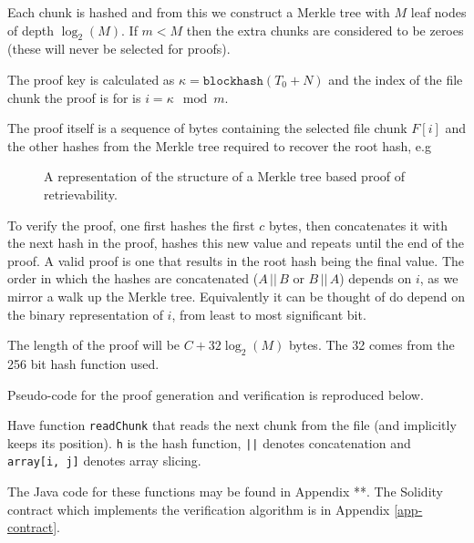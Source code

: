 \documentclass[10pt,twoside,a4paper]{article}
\begin{document}
Each chunk is hashed and from this we construct a Merkle tree with $M$ leaf nodes of depth $\log_2(M)$.
If $m < M$ then the extra chunks are considered to be zeroes (these will never be selected for proofs).



The proof key is calculated as $\kappa = \texttt{blockhash}(T_0 + N)$
and the index of the file chunk the proof is for is $i = \kappa \mod m$.

The proof itself is a sequence of bytes containing the selected file chunk $F[i]$ and the other hashes from the Merkle tree required to recover the root hash, e.g


\begin{figure}[h]
\caption[Proof structure]{A representation of the structure of a Merkle tree based proof of retrievability.}
\end{figure}


To verify the proof, one first hashes the first $c$ bytes, then concatenates it with the next hash in the proof,
hashes this new value and repeats until the end of the proof.
A valid proof is one that results in the root hash being the final value.
The order in which the hashes are concatenated ($A \,||\, B$ or $B \, || \, A$) depends on $i$, as we mirror a walk up the Merkle tree.
Equivalently it can be thought of do depend on the binary representation of $i$, from least to most significant bit.

The length of the proof will be $C + 32 \log_2(M)$ bytes.
The 32 comes from the 256 bit hash function used.

Pseudo-code for the proof generation and verification is reproduced below.

Have function \texttt{readChunk} that reads the next chunk from the file (and implicitly keeps its position).
\texttt{h} is the hash function, \texttt{||} denotes concatenation and \texttt{array[i, j]} denotes array slicing.

The Java code for these functions may be found in Appendix **.
The Solidity contract which implements the verification algorithm is in Appendix \ref{app-contract}.
\end{document}

